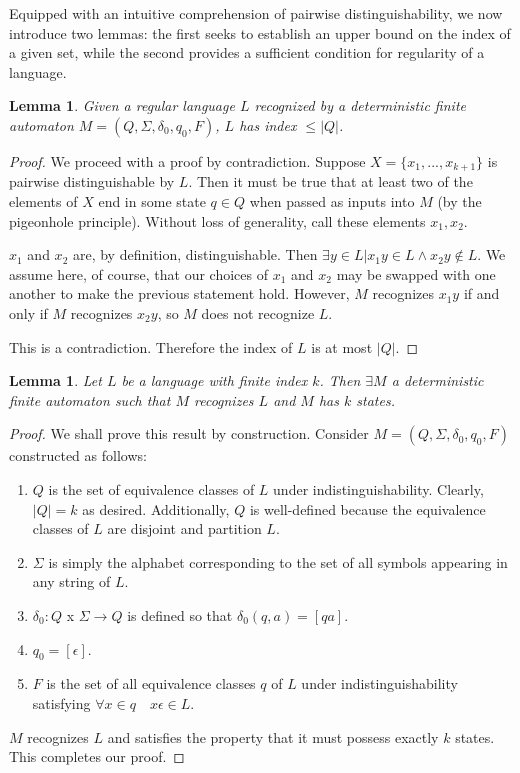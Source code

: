 \documentclass[12pt]{article}
\newtheorem{lemma}[theorem]{Lemma}
\theoremstyle{definition}
\theoremstyle{remark}
\begin{document}
Equipped with an intuitive comprehension of pairwise distinguishability, we now introduce two lemmas: the first seeks to establish an upper bound on the index of a given set, while the second provides a sufficient condition for regularity of a language.

\begin{lemma}
Given a regular language $L$ recognized by a deterministic finite automaton $M = (Q,\Sigma,\delta_0,q_0,F)$, $L$ has index $\leq |Q|$.
\end{lemma}

\begin{proof}
We proceed with a proof by contradiction. Suppose $X=\{x_1,...,x_{k+1}\}$ is pairwise distinguishable by $L$. Then it must be true that at least two of the elements of $X$ end in some state $q \in Q$ when passed as inputs into $M$ (by the pigeonhole principle). Without loss of generality, call these elements $x_1,x_2$.

$x_1$ and $x_2$ are, by definition, distinguishable. Then $\exists y \in L | x_1y \in L \wedge x_2y \notin L$. We assume here, of course, that our choices of $x_1$ and $x_2$ may be swapped with one another to make the previous statement hold. However, $M$ recognizes $x_1y$ if and only if $M$ recognizes $x_2y$, so
$M$ does not recognize $L$.

This is a contradiction. Therefore the index of $L$ is at most $|Q|$.
\end{proof}

\begin{lemma}
Let $L$ be a language with finite index $k$. Then $\exists M$ a deterministic finite automaton such that $M$ recognizes $L$ and $M$ has $k$ states.
\end{lemma}

\begin{proof}
We shall prove this result by construction. Consider $M=(Q,\Sigma,\delta_0,q_0,F)$ constructed as follows:
\begin{enumerate}
	\item{$Q$ is the set of equivalence classes of $L$ under indistinguishability. Clearly, $|Q| = k$ as desired. Additionally, $Q$ is well-defined because the equivalence classes of $L$ are disjoint and partition $L$.}
	\item{$\Sigma$ is simply the alphabet corresponding to the set of all symbols appearing in any string of $L$.}
	\item{$\delta_0:Q$ x $\Sigma \rightarrow Q$ is defined so that $\delta_0(q,a) = [qa]$.}
	\item{$q_0 = [ \epsilon ]$.}
	\item{$F$ is the set of all equivalence classes $q$ of $L$ under indistinguishability satisfying $\forall x \in q \quad x\epsilon \in L$.}
\end{enumerate}

$M$ recognizes $L$ and satisfies the property that it must possess exactly $k$ states. This completes our proof.
\end{proof}
\end{document}
